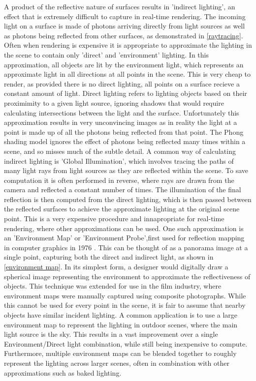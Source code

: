 \documentclass[ %
                    author={Gavin Parker},
                supervisor={Dr. Neill Campbell},
                    degree={MEng},
                     title={Deep Siamese Networks for Illumination Estimation from Stereo Images},
                  subtitle={},
                      type={research},
                      year={2018} ]{dissertation}
\begin{document}
A product of the reflective nature of surfaces results in 'indirect lighting', an effect that is extremely difficult to capture in real-time rendering. The incoming light on a surface is made of photons arriving directly from light sources as well as photons being reflected from other surfaces, as demonstrated in \ref{raytracing}. Often when rendering is expensive it is appropriate to approximate the lighting in the scene to contain only 'direct' and 'environment' lighting. In this approximation, all objects are lit by the environment light, which represents an approximate light in all directions at all points in the scene. This is very cheap to render, as provided there is no direct lighting, all points on a surface recieve a constant amount of light. Direct lighting refers to lighting objects based on their proximimity to a given light source, ignoring shadows that would require calculating intersections between the light and the surface. Unfortunately this approximation results in very unconvincing images as in reality the light at a point is made up of all the photons being reflected from that point. The Phong shading model ignores the effect of photons being reflected many times within a scene, and so misses much of the subtle detail. A common way of calculating indirect lighting is 'Global Illumination', which involves tracing the paths of many light rays from light sources as they are reflected within the scene. To save computation it is often performed in reverse, where rays are drawn from the camera and reflected a constant number of times. The illumination of the final reflection is then computed from the direct lighting, which is then passed between the reflected surfaces to achieve the approximate lighting at the original scene point. This is a very expensive procedure and innapropriate for real-time rendering, where other approximations can be used. One such approximation is an 'Environment Map' or 'Environment Probe',first used for reflection mapping in computer graphics in 1976 \cite{Blinn:1976:TRC:360349.360353}. This can be thought of as a panorama image at a single point, capturing both the direct and indirect light, as shown in \ref{environment map}. In its simplest form, a designer would digitally draw a spherical image representing the environment to approximate the reflectiveness of objects. This technique was extended for use in the film industry, where environment maps were manually captured using composite photographs\cite{Debevec:1998:RSO:280814.280864}. While this cannot be used for every point in the scene, it is fair to assume that nearby objects have similar incident lighting. A common application is to use a large environment map to represent the lighting in outdoor scenes, where the main light source is the sky. This results in a vast improvement over a single Environment/Direct light combination, while still being inexpensive to compute. Furthermore, multiple environment maps can be blended together to roughly represent the lighting across larger scenes, often in combination with other approximations such as baked lighting.
\end{document}
